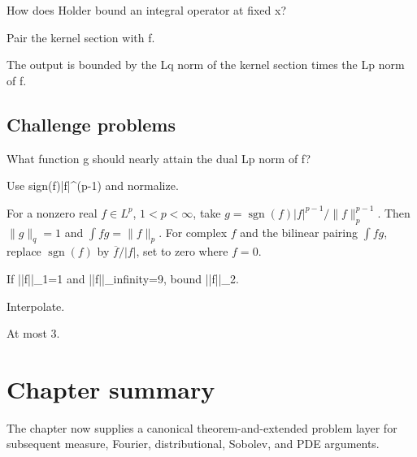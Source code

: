 \begin{exercise}\label{exr:iii07-expand-14}
How does Holder bound an integral operator at fixed x?
\end{exercise}
\begin{hint}
Pair the kernel section with f.
\end{hint}
\begin{solution}
The output is bounded by the Lq norm of the kernel section times the Lp norm of f.
\end{solution}

\subsection*{Challenge problems}

\begin{exercise}\label{exr:iii07-expand-15}
What function g should nearly attain the dual Lp norm of f?
\end{exercise}
\begin{hint}
Use sign(f)|f|\textasciicircum{}(p-1) and normalize.
\end{hint}
\begin{solution}
For a nonzero real $f\in L^p$, $1<p<\infty$, take $g=\operatorname{sgn}(f)|f|^{p-1}/\|f\|_p^{p-1}$. Then $\|g\|_q=1$ and $\int fg=\|f\|_p$. For complex $f$ and the bilinear pairing $\int fg$, replace $\operatorname{sgn}(f)$ by $\overline f/|f|$, set to zero where $f=0$.
\end{solution}

\begin{exercise}[L1-Linfinity to L2]\label{exr:iii07-expand-16}
If ||f||\_1=1 and ||f||\_infinity=9, bound ||f||\_2.
\end{exercise}
\begin{hint}
Interpolate.
\end{hint}
\begin{solution}
At most 3.
\end{solution}
\section*{Chapter summary}
The chapter now supplies a canonical theorem-and-extended problem layer for subsequent measure, Fourier, distributional, Sobolev, and PDE arguments.
